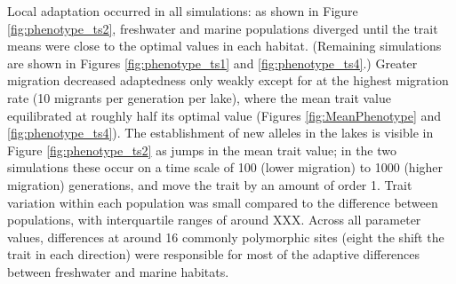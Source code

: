 \documentclass{article}
\newcommand{\plr}[1]{\todo[linecolor=blue,backgroundcolor=blue!25,bordercolor=blue]{#1}}
\begin{document}

Local adaptation occurred in all simulations: as shown in Figure \ref{fig:phenotype_ts2}, freshwater and marine populations diverged until the trait means were close to the optimal values in each habitat. (Remaining simulations are shown in Figures \ref{fig:phenotype_ts1} and \ref{fig:phenotype_ts4}.) Greater migration decreased adaptedness only weakly except for at the highest migration rate (10 migrants per generation per lake), where the mean trait value equilibrated at roughly half its optimal value (Figures \ref{fig:MeanPhenotype} and \ref{fig:phenotype_ts4}). The establishment of new alleles in the lakes is visible in Figure \ref{fig:phenotype_ts2}
as jumps in the mean trait value; in the two simulations these occur on a time scale of 100 (lower migration) to 1000 (higher migration) generations, and move the trait by an amount of order 1. Trait variation within each population was small compared to the difference between populations, with interquartile ranges of around XXX.\plr{TODO} Across all parameter values, differences at around 16 commonly polymorphic sites (eight the shift the trait in each direction) were responsible for most of the adaptive differences between freshwater and marine habitats.

\plr{ALSO TODO: CHECK THIS}
\end{document}

